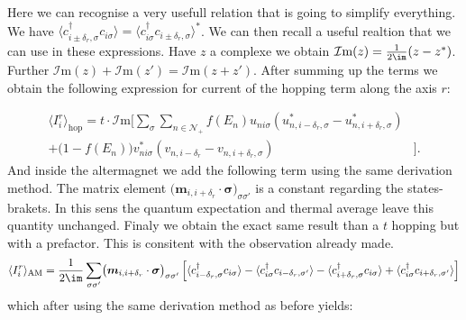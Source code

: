 \documentclass[../main.tex]{subfile}
\begin{document}
Here we can recognise a very usefull relation that is going to simplify everything. We have $\langle c_{i\pm\delta_r,\sigma}^{\dagger} c_{i\sigma}\rangle = \langle c_{i\sigma}^{\dagger}c_{i\pm\delta_{r},\sigma} \rangle^{\ast}$.
We can then recall a useful realtion that we can use in these expressions. Have $z$ a complexe we obtain $\mathcal{I}\text{m}(z) = \frac{1}{2\im}(z-z^{\ast})$. Further $\mathcal{I}\text{m}(z)+\mathcal{I}\text{m}(z') = \mathcal{I}\text{m}(z+z')$.
After summing up the terms we obtain the following expression for current of the hopping term along the axis $r$:

\begin{equation}
    \begin{aligned}
        \langle I_i^r\rangle_{\text{hop}} = t\cdot\mathcal{I}\text{m}\biggl[ \sum_{\sigma}\sum_{n\in\mathcal{N}_+} 
            f(E_n)u_{ni\sigma}\left(u_{n,i-\delta_r,\sigma}^{\ast} - u_{n,i+\delta_r,\sigma}^{\ast}\right) &\\
            +\bigl(1-f(E_n)\bigr) v_{ni\sigma}^{\ast}\left(v_{n,i-\delta_r} - v_{n,i+\delta_r,\sigma}\right)&\biggr].
    \end{aligned}
\end{equation}
And inside the altermagnet we add the following term using the same derivation method. The matrix element $\bigl(\bm{m}_{i,i+\delta_r}\cdot\bm{\sigma}\bigr)_{\sigma\sigma'}$ is a constant regarding
the states-brakets. In this sens the quantum expectation and thermal average leave this quantity unchanged. Finaly we obtain the exact
same result than a $t$ hopping but with a prefactor. This is consitent with the observation already made.
\begin{equation*}
    \begin{aligned}
    \langle I_i^r\rangle_{\text{AM}} = \frac{1}{2\im}\sum_{\sigma\sigma'}\bigl(\bm{m}_{i,i+\delta_r}\cdot\bm{\sigma}\bigr)_{\sigma\sigma'}\left[
        \langle c_{i-\delta_{r},\sigma}^{\dagger} c_{i\sigma}\rangle
        -\langle c_{i\sigma}^{\dagger}            c_{i-\delta_{r},\sigma'}\rangle
        -\langle c_{i+\delta_{r},\sigma}^{\dagger} c_{i\sigma}\rangle
        +\langle c_{i\sigma}^{\dagger}            c_{i+\delta_{r},\sigma'}\rangle\right]
\end{aligned}
\end{equation*}
which after using the same derivation method as before yields:
\end{document}
